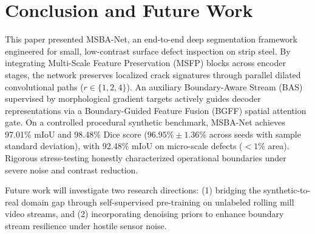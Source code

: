 \documentclass{ieeeaccess}
\begin{document}
\section{Conclusion and Future Work}
\label{sec:conclusion_future}
This paper presented MSBA-Net, an end-to-end deep segmentation framework engineered for small, low-contrast surface defect inspection on strip steel. By integrating Multi-Scale Feature Preservation (MSFP) blocks across encoder stages, the network preserves localized crack signatures through parallel dilated convolutional paths ($r \in \{1, 2, 4\}$). An auxiliary Boundary-Aware Stream (BAS) supervised by morphological gradient targets actively guides decoder representations via a Boundary-Guided Feature Fusion (BGFF) spatial attention gate. On a controlled procedural synthetic benchmark, MSBA-Net achieves 97.01\% mIoU and 98.48\% Dice score ($96.95\% \pm 1.36\%$ across seeds with sample standard deviation), with 92.48\% mIoU on micro-scale defects ($<1\%$ area). Rigorous stress-testing honestly characterized operational boundaries under severe noise and contrast reduction.

Future work will investigate two research directions: (1) bridging the synthetic-to-real domain gap through self-supervised pre-training on unlabeled rolling mill video streams, and (2) incorporating denoising priors to enhance boundary stream resilience under hostile sensor noise.




\EOD
\end{document}
